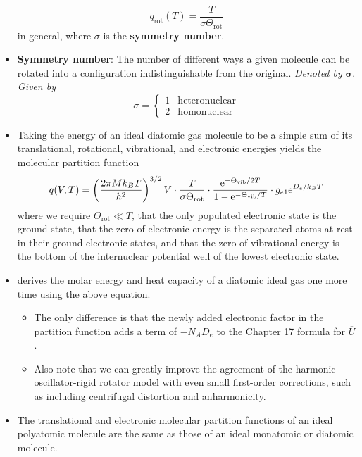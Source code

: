 \documentclass[../notes.tex]{subfiles}
\begin{document}
\begin{itemize}
    \begin{equation*}
        q_\text{rot}(T) = \frac{T}{\sigma\Theta_\text{rot}}
    \end{equation*}
    in general, where $\sigma$ is the \textbf{symmetry number}.
    \item \textbf{Symmetry number}: The number of different ways a given molecule can be rotated into a configuration indistinguishable from the original. \emph{Denoted by} $\bm{\sigma}$. \emph{Given by}
    \begin{equation*}
        \sigma =
        \begin{cases}
            1 & \text{heteronuclear}\\
            2 & \text{homonuclear}
        \end{cases}
    \end{equation*}
    \item Taking the energy of an ideal diatomic gas molecule to be a simple sum of its translational, rotational, vibrational, and electronic energies yields the molecular partition function
    \begin{equation*}
        q(V,T) = \left( \frac{2\pi Mk_BT}{h^2} \right)^{3/2}V\cdot\frac{T}{\sigma\Theta_\text{rot}}\cdot\frac{\e[-\Theta_\text{vib}/2T]}{1-\e[-\Theta_\text{vib}/T]}\cdot g_{e1}\e[D_e/k_BT]
    \end{equation*}
    where we require $\Theta_\text{rot}\ll T$, that the only populated electronic state is the ground state, that the zero of electronic energy is the separated atoms at rest in their ground electronic states, and that the zero of vibrational energy is the bottom of the internuclear potential well of the lowest electronic state.
    \item \textcite{bib:McQuarrieSimon} derives the molar energy and heat capacity of a diatomic ideal gas one more time using the above equation.
    \begin{itemize}
        \item The only difference is that the newly added electronic factor in the partition function adds a term of $-N_AD_e$ to the Chapter 17 formula for $\overline{U}$.
        \item Also note that we can greatly improve the agreement of the harmonic oscillator-rigid rotator model with even small first-order corrections, such as including centrifugal distortion and anharmonicity.
    \end{itemize}
    \item The translational and electronic molecular partition functions of an ideal polyatomic molecule are the same as those of an ideal monatomic or diatomic molecule.

\end{itemize}
\end{document}
